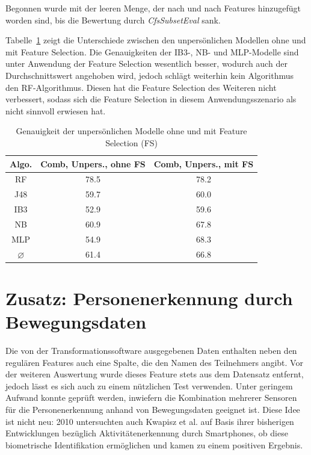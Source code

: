 Begonnen wurde mit der leeren Menge, der nach und nach Features hinzugefügt worden sind, bis die Bewertung durch \textit{CfsSubsetEval} sank.

Tabelle~\ref{tab:accuracy-feature-selection} zeigt die Unterschiede zwischen den unpersönlichen Modellen ohne und mit Feature Selection. Die Genauigkeiten der \acs{IB}3-, \acs{NB}- und \acs{MLP}-Modelle sind unter Anwendung der Feature Selection wesentlich besser, wodurch auch der Durchschnittswert angehoben wird, jedoch schlägt weiterhin kein Algorithmus den \acs{RF}-Algorithmus. Diesen hat die Feature Selection des Weiteren nicht verbessert, sodass sich die Feature Selection in diesem Anwendungsszenario als nicht sinnvoll erwiesen hat.

\begin{table}[h]
\centering
\begin{tabular}{|c|c|c|}
	\hline 
	\textbf{Algo.} & \textbf{Comb, Unpers., ohne FS} & \textbf{Comb, Unpers., mit FS} \\ 
	\hline 
	\acs{RF} & 78.5 & 78.2 \\ 
	\acs{J48} & 59.7 & 60.0 \\ 
	\acs{IB}3 & 52.9 & 59.6 \\ 
	\acs{NB} & 60.9 & 67.8 \\ 
	\acs{MLP} & 54.9 & 68.3 \\ 
	\hline 
	$\varnothing$ & 61.4 & 66.8 \\ 
	\hline 
\end{tabular}
\caption[Genauigkeit der unpersönlichen Modelle ohne und mit Feature Selection]{Genauigkeit der unpersönlichen Modelle ohne und mit Feature Selection (FS)}
\label{tab:accuracy-feature-selection}
\end{table}

\section{Zusatz: Personenerkennung durch Bewegungsdaten}
Die von der Transformationssoftware ausgegebenen Daten enthalten neben den regulären Features auch eine Spalte, die den Namen des Teilnehmers angibt. Vor der weiteren Auswertung wurde dieses Feature stets aus dem Datensatz entfernt, jedoch lässt es sich auch zu einem nützlichen Test verwenden. Unter geringem Aufwand konnte geprüft werden, inwiefern die Kombination mehrerer Sensoren für die Personenerkennung anhand von Bewegungsdaten geeignet ist. Diese Idee ist nicht neu: 2010 untersuchten auch Kwapisz et al. auf Basis ihrer bisherigen Entwicklungen bezüglich Aktivitätenerkennung durch Smartphones, ob diese biometrische Identifikation ermöglichen \cite{Kwapisz2010} und kamen zu einem positiven Ergebnis.

